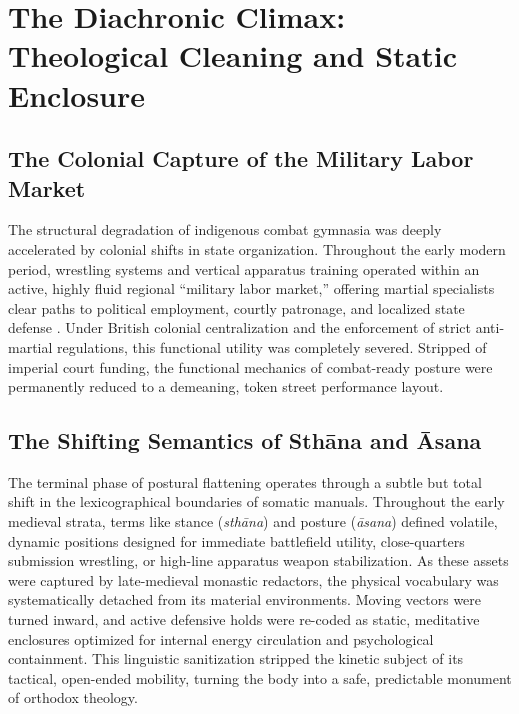 \documentclass[11pt,twoside,letterpaper]{article}
\begin{document}
\section{The Diachronic Climax: Theological Cleaning and Static Enclosure}

\subsection{The Colonial Capture of the Military Labor Market}
The structural degradation of indigenous combat gymnasia was deeply accelerated by colonial shifts in state organization. Throughout the early modern period, wrestling systems and vertical apparatus training operated within an active, highly fluid regional “military labor market,” offering martial specialists clear paths to political employment, courtly patronage, and localized state defense \citep{Thomas2025}. Under British colonial centralization and the enforcement of strict anti-martial regulations, this functional utility was completely severed. Stripped of imperial court funding, the functional mechanics of combat-ready posture were permanently reduced to a demeaning, token street performance layout.

\subsection{The Shifting Semantics of Sthāna and Āsana}
The terminal phase of postural flattening operates through a subtle but total shift in the lexicographical boundaries of somatic manuals. Throughout the early medieval strata, terms like stance (\textit{sthāna}) and posture (\textit{āsana}) defined volatile, dynamic positions designed for immediate battlefield utility, close-quarters submission wrestling, or high-line apparatus weapon stabilization. As these assets were captured by late-medieval monastic redactors, the physical vocabulary was systematically detached from its material environments. Moving vectors were turned inward, and active defensive holds were re-coded as static, meditative enclosures optimized for internal energy circulation and psychological containment. This linguistic sanitization stripped the kinetic subject of its tactical, open-ended mobility, turning the body into a safe, predictable monument of orthodox theology.
\end{document}
